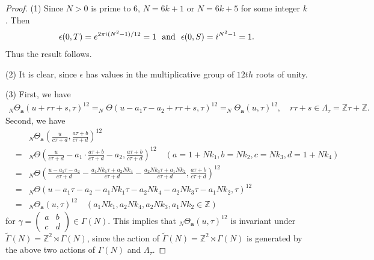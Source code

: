 \documentclass[12pt,amstex,amssymb]{article}
\theoremstyle{plain}
\theoremstyle{definition}
\def\Z{{\mathbb Z}}
\newcommand{\be}{\begin{eqnarray*}}
\newcommand{\ee}{\end{eqnarray*}}
\newcommand{\ba}{\mathbf{a}}
\begin{document}
\begin{proof}
	(1) Since $N >0$ is prime to 6, $N=6k+1$ or $N=6k+5$ for some integer $k$. Then
	\be
	\epsilon(0, T) = e^{2\pi i({N}^2-1)/12}=1\ \ \hbox{\rm and}\ \ \epsilon(0,S) = i^{{N}^2-1}=1.
	\ee
	Thus the result follows.
	
	(2) It is clear, since $\epsilon$ has values in the multiplicative group %
	of $12th$ roots of unity.
	
	
	
	
	
	
	(3) First, we have
	\be
	_{N}\!\Theta_{\ba} (u + r\tau +s ,\tau)^{12} = _{N}\!\Theta (u-a_1\tau-a_2+ r\tau +s , \tau)^{12}=_{N}\!\Theta_{\ba} (u,\tau)^{12}, \quad r\tau +s \in \Lambda_\tau=\Z\tau+\Z.
	\ee
	Second, we have
	\be
	&&_{N}\!\Theta_\ba \left(\frac{u}{c\tau+d}, \frac{a\tau+b}{c\tau+d}\right)^{12} \\
		&=& _{N}\!\Theta \left(\frac{u}{c\tau+d}-a_1\cdot \frac{a\tau+b}{c\tau+d}-a_2, \frac{a\tau+b}{c\tau+d}\right)^{12}
	\quad (a=1+Nk_1, b=Nk_2, c=Nk_3, d=1+Nk_4)\\
	&=&   _{N}\!\Theta \left(\frac{u-a_1\tau-a_2}{c\tau+d}-\frac{a_1Nk_1\tau+a_2Nk_4}{c\tau+d}-\frac{a_2Nk_3 \tau + a_1Nk_2}{c\tau+d}, \frac{a\tau+b}{c\tau+d}\right)^{12} \\
         &=&  _{N}\!\Theta (u-a_1\tau-a_2 - a_1Nk_1\tau-a_2Nk_4-a_2Nk_3 \tau - a_1Nk_2, \tau)^{12} \\
	&=&   	_{N}\!\Theta_{\ba} (u,\tau)^{12} \quad (a_1Nk_1, a_2Nk_4,a_2Nk_3,a_1Nk_2 \in \Z)
	\ee
	for $\gamma=\begin{pmatrix} a & b \\ c & d \end{pmatrix} \in \Gamma(N)$.
	This implies that $ _{N}\!\Theta_{\ba} (u,\tau)^{12}$ is invariant under $\tilde \Gamma(N)=\Z^2 \rtimes \Gamma(N)$, since the action of $\tilde \Gamma(N)=\Z^2 \rtimes \Gamma(N)$ is generated by the above two actions of $\Gamma(N)$ and $\Lambda_\tau$.
\end{proof}
\end{document}

